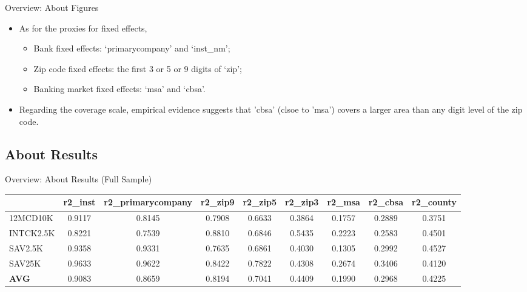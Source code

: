 \documentclass{beamer}
\begin{document}
\begin{frame}{Overview: About Figures}
\begin{itemize}

    \item As for the proxies for fixed effects,

\begin{itemize}
        \item Bank fixed effects: ‘primarycompany’ and ‘inst\_nm’;
        \item Zip code fixed effects: the first 3 or 5 or 9 digits of ‘zip’;
        \item Banking market fixed effects: ‘msa’ and ‘cbsa’.
    \end{itemize}

    \item Regarding the coverage scale, empirical evidence suggests that 'cbsa' (clsoe to 'msa') covers a larger area than any digit level of the zip code.
\end{itemize}

\end{frame}

\subsection{About Results}

\begin{frame}{Overview: About Results (Full Sample) }
    \centering
\fontsize{5pt}{6pt}\selectfont
\begin{tabular}{lcccccccc}
    \toprule
    & \textbf{r2\_inst} & \textbf{r2\_primarycompany} & \textbf{r2\_zip9} & \textbf{r2\_zip5} & \textbf{r2\_zip3} & \textbf{r2\_msa} & \textbf{r2\_cbsa} & \textbf{r2\_county} \\
    \midrule
    12MCD10K   & 0.9117 & 0.8145 & 0.7908 & 0.6633 & 0.3864 & 0.1757 & 0.2889 & 0.3751 \\
    INTCK2.5K  & 0.8221 & 0.7539 & 0.8810 & 0.6846 & 0.5435 & 0.2223 & 0.2583 & 0.4501 \\
    SAV2.5K    & 0.9358 & 0.9331 & 0.7635 & 0.6861 & 0.4030 & 0.1305 & 0.2992 & 0.4527 \\
    SAV25K     & 0.9633 & 0.9622 & 0.8422 & 0.7822 & 0.4308 & 0.2674 & 0.3406 & 0.4120 \\
    \midrule
    \textbf{AVG} & 0.9083 & 0.8659 & 0.8194 & 0.7041 & 0.4409 & 0.1990 & 0.2968 & 0.4225 \\
    \bottomrule
\end{tabular}

\end{frame}
\end{document}
